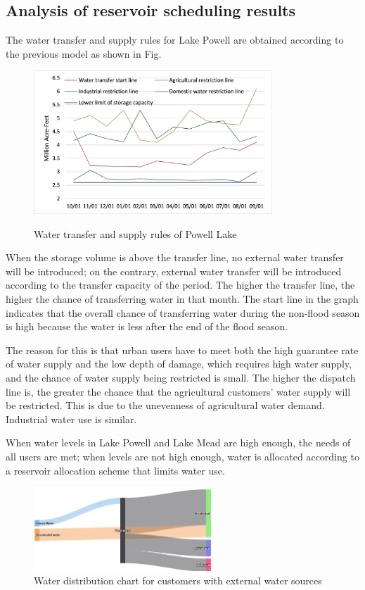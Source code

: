 \subsection{Analysis of reservoir scheduling results}
The water transfer and supply rules for Lake Powell are obtained according to the previous model as shown in Fig.
\par
\begin{figure}[htbp]
  \centering
  \includegraphics[width=0.8\textwidth]{figures/result.png}
  \label{fig:res2}
  \caption{Water transfer and supply rules of Powell Lake}
\end{figure}
When the storage volume is above the transfer line, no external water transfer will be introduced; on the contrary, external water transfer will be introduced according to the transfer capacity of the period. The higher the transfer line, the higher the chance of transferring water in that month. The start line in the graph indicates that the overall chance of transferring water during the non-flood season is high because the water is less after the end of the flood season.
\par
The reason for this is that urban users have to meet both the high guarantee rate of water supply and the low depth of damage, which requires high water supply, and the chance of water supply being restricted is small. The higher the dispatch line is, the greater the chance that the agricultural customers' water supply will be restricted. This is due to the unevenness of agricultural water demand. Industrial water use is similar.
\par
When water levels in Lake Powell and Lake Mead are high enough, the needs of all users are met; when levels are not high enough, water is allocated according to a reservoir allocation scheme that limits water use.
\par
\begin{figure}[htbp]
  \centering
  \label{fig:hig}
  \includegraphics[width=0.6\textwidth]{figures/higchart.png}
  \caption{Water distribution chart for customers with external water sources}
\end{figure}
